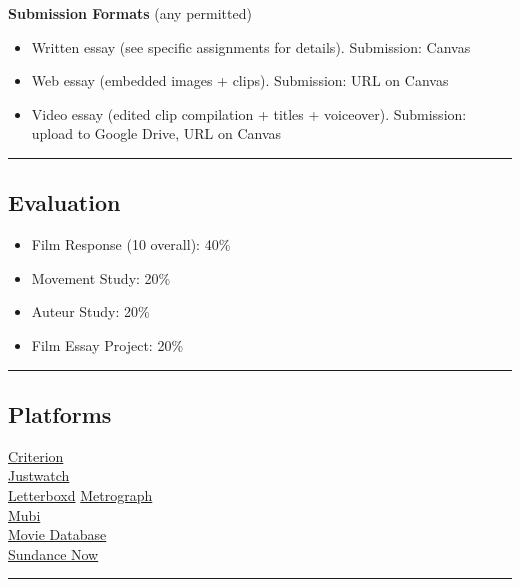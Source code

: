 \documentclass[
  letterpaper,
  DIV=11,
  numbers=noendperiod,
  oneside]{scrartcl}
\providecommand{\tightlist}{%
  \setlength{\itemsep}{0pt}\setlength{\parskip}{0pt}}
\begin{document}
\textbf{Submission Formats} (any permitted)

\begin{itemize}
\tightlist
\item
  Written essay (see specific assignments for details). Submission:
  Canvas
\item
  Web essay (embedded images + clips). Submission: URL on Canvas
\item
  Video essay (edited clip compilation + titles + voiceover).
  Submission: upload to Google Drive, URL on Canvas
\end{itemize}

\begin{center}\rule{0.5\linewidth}{0.5pt}\end{center}

\subsection{Evaluation}\label{evaluation}

\begin{itemize}
\tightlist
\item
  Film Response (10 overall): 40\%
\item
  Movement Study: 20\%
\item
  Auteur Study: 20\%\\
\item
  Film Essay Project: 20\%
\end{itemize}

\begin{center}\rule{0.5\linewidth}{0.5pt}\end{center}

\subsection{Platforms}\label{platforms}

\href{https://www.criterion.com/}{Criterion}\\
\href{https://justwatch.io/}{Justwatch}\\
\href{https://letterboxd.com/}{Letterboxd}
\href{https://metrograph.com/}{Metrograph}\\
\href{https://mubi.com/}{Mubi}\\
\href{https://www.themoviedb.org/?language=en-US}{Movie Database}\\
\href{https://sundancenow.com}{Sundance Now}

\begin{center}\rule{0.5\linewidth}{0.5pt}\end{center}
\end{document}
